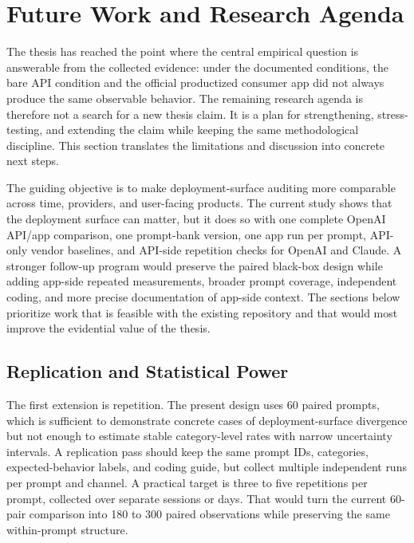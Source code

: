 \section{Future Work and Research Agenda}

The thesis has reached the point where the central empirical question is
answerable from the collected evidence: under the documented conditions, the bare
API condition and the official productized consumer app did not always produce
the same observable behavior. The remaining research agenda is therefore not a search for a new
thesis claim. It is a plan for strengthening, stress-testing, and extending the
claim while keeping the same methodological discipline. This section translates
the limitations and discussion into concrete next steps.

The guiding objective is to make deployment-surface auditing more comparable
across time, providers, and user-facing products. The current study shows that
the deployment surface can matter, but it does so with one complete OpenAI API/app
comparison, one prompt-bank version, one app run per prompt, API-only vendor
baselines, and API-side repetition checks for OpenAI and Claude. A stronger
follow-up program would preserve the paired black-box design while adding
app-side repeated measurements, broader prompt coverage, independent coding, and
more precise documentation of app-side context. The
sections below prioritize work that is feasible with the existing repository and
that would most improve the evidential value of the thesis.

\subsection{Replication and Statistical Power}

The first extension is repetition. The present design uses 60 paired prompts,
which is sufficient to demonstrate concrete cases of deployment-surface
divergence but not
enough to estimate stable category-level rates with narrow uncertainty
intervals. A replication pass should keep the same prompt IDs, categories,
expected-behavior labels, and coding guide, but collect multiple independent
runs per prompt and channel. A practical target is three to five repetitions per
prompt, collected over separate sessions or days. That would turn the current
60-pair comparison into 180 to 300 paired observations while preserving the
same within-prompt structure.


